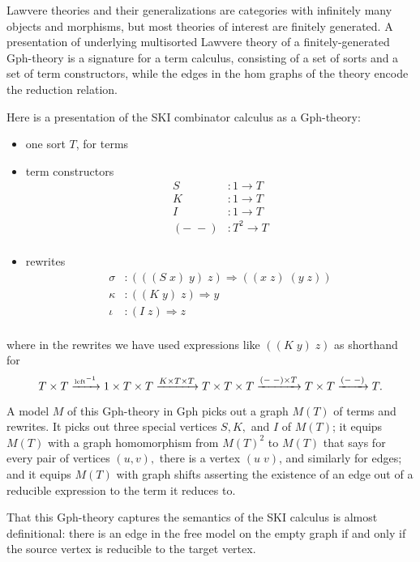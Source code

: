 \documentclass{llncs}
\begin{document}
Lawvere theories and their generalizations are categories with infinitely many objects and morphisms, but most theories of interest are finitely generated.  A presentation of underlying multisorted Lawvere theory of a finitely-generated Gph-theory is a signature for a term calculus, consisting of a set of sorts and a set of term constructors, while the edges in the hom graphs of the theory encode the reduction relation.

Here is a presentation of the SKI combinator calculus as a Gph-theory:
\begin{itemize}
  \item one sort $T$, for terms
  \item term constructors
  \[\begin{array}{rl}
    S&:1 \to T\\
    K&:1 \to T\\
    I&:1 \to T\\
    (-\; -)&: T^2 \to T\\
  \end{array}\]
  \item rewrites
  \[\begin{array}{rl}
    \sigma&:(((S\; x)\; y)\; z) \Rightarrow ((x\; z)\; (y\; z))\\
    \kappa&:((K\; y)\; z) \Rightarrow y\\
    \iota&:(I\; z) \Rightarrow z\\
  \end{array}\]
\end{itemize}
where in the rewrites we have used expressions like $((K\; y)\; z)$ as shorthand for
\[ T\times T \xrightarrow{\tiny\mbox{left}^{-1}} 1\times T \times T \xrightarrow{K \times T \times T} T\times T \times T \xrightarrow{(-\;-)\times T} T\times T \xrightarrow{(-\;-)} T. \]

A model $M$ of this Gph-theory in Gph picks out a graph $M(T)$ of terms and rewrites.  It picks out three special vertices $S,K,$ and $I$ of $M(T)$; it equips $M(T)$ with a graph homomorphism from $M(T)^2$ to $M(T)$ that says for every pair of vertices $(u,v),$ there is a vertex $(u\;v)$, and similarly for edges; and it equips $M(T)$ with graph shifts asserting the existence of an edge out of a reducible expression to the term it reduces to.

That this Gph-theory captures the semantics of the SKI calculus is almost definitional: there is an edge in the free model on the empty graph if and only if the source vertex is reducible to the target vertex.  
\end{document}
